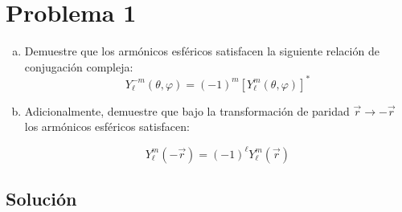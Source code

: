 \documentclass[a4paper]{article}
\begin{document}
\tableofcontents

\section{Problema 1}

\begin{enumerate}[a)]
	\item Demuestre que los armónicos esféricos satisfacen la siguiente relación de conjugación compleja:
$$
Y_\ell^{-m}(\theta,\varphi) = (-1)^m \left[Y_\ell^{m}(\theta,\varphi)\right]^*
$$

	\item Adicionalmente, demuestre que bajo la transformación de paridad $\vec{r} \to -\vec{r}$ los armónicos esféricos satisfacen:

$$Y_\ell^m(-\vec{r}) = (-1)^\ell Y_\ell^m(\vec{r})$$
\end{enumerate}

\subsection{Solución}
\end{document}
